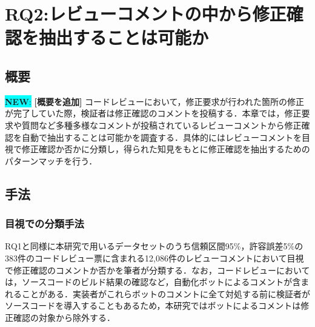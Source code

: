 \documentclass[11pt]{jreport}
\newcommand{\RQTwo}{レビューコメントの中から修正確認を抽出することは可能か}
\newcommand{\new}[1]{\colorbox{cyan}{{\bf NEW}:}{\color{black} {\textbf{[#1]}}}}
\begin{document}
\begin{table}[t]
\centering
  \caption{修正要求内容毎の再現率}
  \label{table:request_accuracy}
\end{table}

\chapter{RQ2:\RQTwo}\label{chap:RQ2}

\section{概要}
\new{概要を追加}
コードレビューにおいて，修正要求が行われた箇所の修正が完了していた際，検証者は修正確認のコメントを投稿する．本章では，修正要求や質問など多種多様なコメントが投稿されているレビューコメントから修正確認を自動で抽出することは可能かを調査する．具体的にはレビューコメントを目視で修正確認か否かに分類し，得られた知見をもとに修正確認を抽出するためのパターンマッチを行う．

\section{手法}
\subsection{目視での分類手法}
RQ1と同様に本研究で用いるデータセットのうち信頼区間95\%，許容誤差5\%の383件のコードレビュー票に含まれる12,086件のレビューコメントにおいて目視で修正確認のコメントか否かを筆者が分類する．なお，コードレビューにおいては，ソースコードのビルド結果の確認など，自動化ボットによるコメントが含まれることがある．実装者がこれらボットのコメントに全て対処する前に検証者がソースコードを導入することもあるため，本研究ではボットによるコメントは修正確認の対象から除外する．
\end{document}
